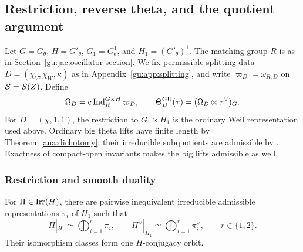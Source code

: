 \subsection{Restriction, reverse theta, and the quotient argument}
\label{fun:gu-passage}

Let $G=G_\theta$, $H=G'_\theta$, $G_1=G_\theta^1$, and
$H_1=(G'_\theta)^1$. The matching group $R$ is as in
Section~\ref{gu:jac:oscillator-section}. We fix permissible splitting data
$D=(\chi_V,\chi_W,\kappa)$ as in Appendix~\ref{gu:app:splitting},
and write $\varpi_D=\omega_{R,D}$ on $\mathcal S=\mathcal S(Z)$. Define
\[
 \Omega_D=\operatorname{c\!-Ind}_R^{G\times H}\varpi_D,\qquad
 \Theta_D^{\operatorname{GU}}(\tau)=(\Omega_D\otimes\tau^\vee)_G.
\]
For $D=(\chi,1,1)$, the restriction to $G_1\times H_1$ is the ordinary
Weil representation used above. Ordinary big theta lifts have finite
length by Theorem~\ref{ana:dichotomy}; their irreducible subquotients
are admissible by \cite[Theorem~2.5]{BZ77}. Exactness of compact-open
invariants makes the big lifts admissible as well.

\subsubsection{Restriction and smooth duality}

\begin{lemma}\label{fun:restriction}
For \(\Pi\in\operatorname{Irr}(H)\), there are pairwise inequivalent
irreducible admissible representations \(\pi_i\) of \(H_1\) such that
\[
 \Pi|_{H_1}\simeq\bigoplus_{i=1}^r\pi_i,\qquad
 \Pi^\vee|_{H_1}\simeq\bigoplus_{i=1}^r\pi_i^\vee,\qquad r\in\{1,2\}.
\]
Their isomorphism classes form one \(H\)-conjugacy orbit.
\end{lemma}

